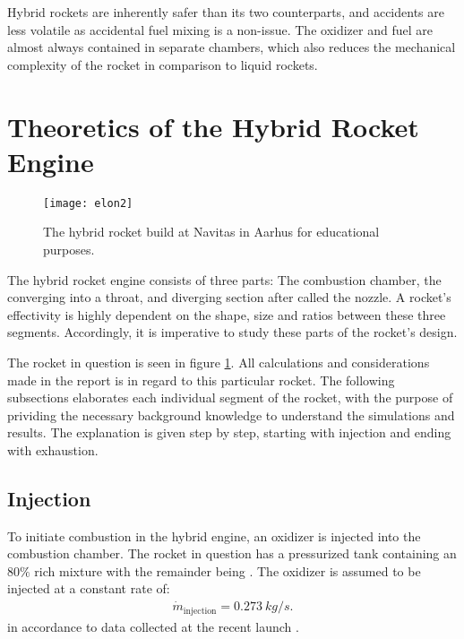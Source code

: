 	Hybrid rockets are inherently safer than its two counterparts, and accidents are less volatile as accidental fuel mixing is a non-issue. The oxidizer and fuel are almost always contained in separate chambers, which also reduces the mechanical complexity of the rocket in comparison to liquid rockets.

\section{Theoretics of the Hybrid Rocket Engine}

\begin{figure}
	\texttt{[image: elon2]}
	\caption{The hybrid rocket build at Navitas in Aarhus for educational purposes.}
	\label{fig:rocketpic}
\end{figure}

	The hybrid rocket engine consists of three parts: The combustion chamber, the converging into a throat, and diverging section after called the nozzle. A rocket's effectivity is highly dependent on the shape, size and ratios between these three segments. Accordingly, it is imperative to study these parts of the rocket's design.
	
	The rocket in question is seen in figure \ref{fig:rocketpic}. All calculations and considerations made in the report is in regard to this particular rocket. The following subsections elaborates each individual segment of the rocket, with the purpose of prividing the necessary background knowledge to understand the simulations and results. The explanation is given step by step, starting with injection and ending with exhaustion.


\subsection{Injection}

	To initiate combustion in the hybrid engine, an oxidizer is injected into the combustion chamber. The rocket in question has a pressurized tank containing an $80 \%$  rich mixture with the remainder being . The oxidizer is assumed to be injected at a constant rate of:
		\begin{align}
			\dot{m}_\text{injection} = \SI{0.273}{kg/s}.
		\end{align}
	in accordance to data collected at the recent launch .
	
